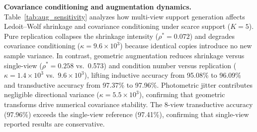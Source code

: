 \textbf{Covariance conditioning and augmentation dynamics.} Table~\ref{tab:aug_sensitivity} analyzes how multi-view support generation affects Ledoit--Wolf shrinkage and covariance conditioning under scarce support ($K=5$). Pure replication collapses the shrinkage intensity ($\rho^* = 0.072$) and degrades covariance conditioning ($\kappa = 9.6\times10^3$) because identical copies introduce no new sample variance. In contrast, geometric augmentation reduces shrinkage versus single-view ($\rho^*=0.258$ vs.\ 0.573) and condition number versus replication ($\kappa = 1.4\times10^3$ vs.\ $9.6\times10^3$), lifting inductive accuracy from 95.08\% to 96.09\% and transductive accuracy from 97.37\% to 97.96\%. Photometric jitter contributes negligible directional variance ($\kappa = 5.5\times10^3$), confirming that geometric transforms drive numerical covariance stability. The 8-view transductive accuracy (97.96\%) exceeds the single-view reference (97.41\%), confirming that single-view reported results are conservative.


